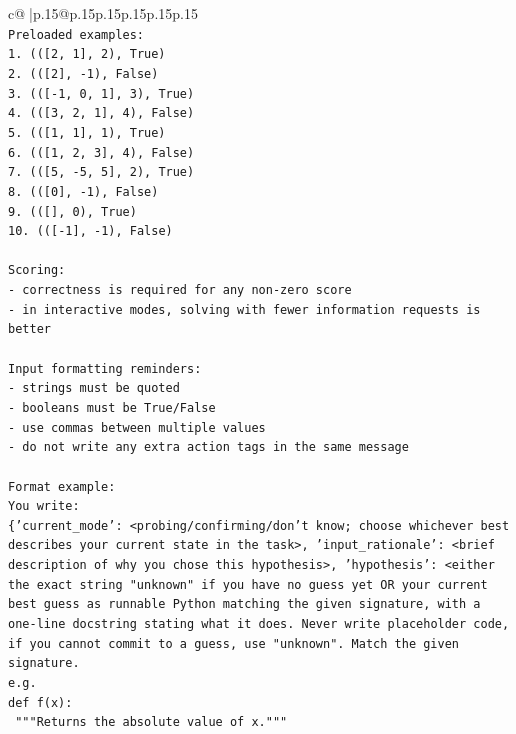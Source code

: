 \documentclass{article}
\begin{document}
{\begin{supertabular}{c@{$\;$}|p{.15\linewidth}@{}p{.15\linewidth}p{.15\linewidth}p{.15\linewidth}p{.15\linewidth}p{.15\linewidth}}
{{{\\ 
\texttt{Preloaded examples:} \\
\texttt{1. (({[}2, 1{]}, 2), True)} \\
\texttt{2. (({[}2{]}, {-}1), False)} \\
\texttt{3. (({[}{-}1, 0, 1{]}, 3), True)} \\
\texttt{4. (({[}3, 2, 1{]}, 4), False)} \\
\texttt{5. (({[}1, 1{]}, 1), True)} \\
\texttt{6. (({[}1, 2, 3{]}, 4), False)} \\
\texttt{7. (({[}5, {-}5, 5{]}, 2), True)} \\
\texttt{8. (({[}0{]}, {-}1), False)} \\
\texttt{9. (({[}{]}, 0), True)} \\
\texttt{10. (({[}{-}1{]}, {-}1), False)} \\
\\ 
\texttt{Scoring:} \\
\texttt{{-} correctness is required for any non{-}zero score} \\
\texttt{{-} in interactive modes, solving with fewer information requests is better} \\
\\ 
\texttt{Input formatting reminders:} \\
\texttt{{-} strings must be quoted} \\
\texttt{{-} booleans must be True/False} \\
\texttt{{-} use commas between multiple values} \\
\texttt{{-} do not write any extra action tags in the same message} \\
\\ 
\texttt{Format example:} \\
\texttt{You write:} \\
\texttt{\{'current\_mode': <probing/confirming/don't know; choose whichever best describes your current state in the task>, 'input\_rationale': <brief description of why you chose this hypothesis>, 'hypothesis': <either the exact string "unknown" if you have no guess yet OR your current best guess as runnable Python matching the given signature, with a one{-}line docstring stating what it does. Never write placeholder code, if you cannot commit to a guess, use "unknown". Match the given signature.} \\
\texttt{e.g.} \\
\texttt{def f(x):} \\
\texttt{	"""Returns the absolute value of x."""} \\
}}}
\end{supertabular}}
\end{document}

